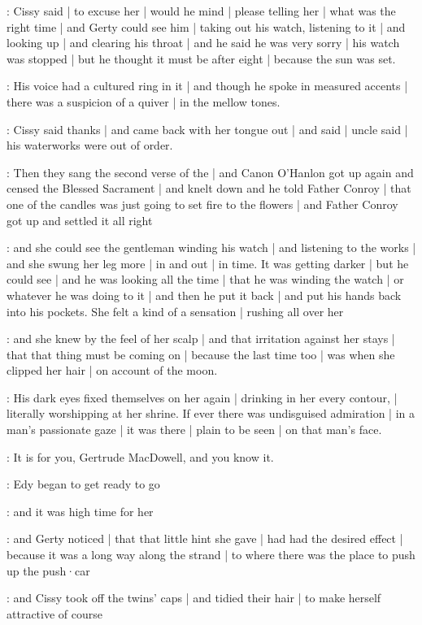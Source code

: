 :
Cissy said |
to excuse her |
would he mind |
please telling her |
what was the right time |
and Gerty could see him |
taking out his watch,
listening to it |
and looking up |
and clearing his throat |
and he said he was very sorry |
his watch was stopped |
but he thought it must be after eight |
because the sun was set.

\gertyRomantic:
His voice had a cultured ring in it |
and though he spoke in measured accents |
there was a suspicion of a quiver |
in the mellow tones.

:
Cissy said thanks |
and came back with her tongue out |%
and said |
uncle said |
his waterworks were out of order.

\Nrelig:
Then they sang the second verse of the  |
and Canon O'Hanlon got up again
and censed the Blessed Sacrament |
and knelt down
and he told Father Conroy |
that one of the candles
was just going to set fire to the flowers |
and Father Conroy got up
and settled it all right

\gertySex:
and she could see the gentleman
winding his watch |
and listening to the works |
and she swung her leg more |
in and out |
in time.
It was getting darker |
but he could see |
and he was looking all the time |
that he was winding the watch |
or whatever he was doing to it |
and then he put it back |
and put his hands back into his pockets.%
She felt a kind of a sensation |
rushing all over her

\gertyReal:
and she knew by the feel of her scalp |
and that irritation against her stays |
that that thing must be coming on |
because the last time too |
was when she clipped her hair |
on account of the moon.

\gertySex:
His dark eyes fixed themselves on her again |
drinking in her every contour, |
literally worshipping at her shrine.
If ever there was undisguised admiration |
in a man's passionate gaze |
it was there |
plain to be seen |
on that man's face.

\gertyNovel:
It is for you,
Gertrude MacDowell,
and you know it.

:
Edy began to get ready to go

\gertyJudgy:
and it was high time for her

\gertyReal:
and Gerty noticed |
that that little hint she gave |
had had the desired effect |
because it was a long way
along the strand |%
to where there was the place
to push up the push·car

\gertyJudgy:
and Cissy took off the twins' caps |
and tidied their hair |
to make herself attractive of course

